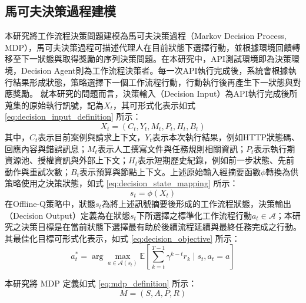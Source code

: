 \begin{ZhChapter}
\subsection{馬可夫決策過程建模}
\text 本研究將工作流程決策問題建模為馬可夫決策過程（Markov Decision Process, MDP），馬可夫決策過程可描述代理人在目前狀態下選擇行動，並根據環境回饋轉移至下一狀態與取得獎勵的序列決策問題\parencite{rao2022foundations}。在本研究中，API測試環境即為決策環境，Decision Agent則為工作流程決策者。每一次API執行完成後，系統會根據執行結果形成狀態，策略選擇下一個工作流程行動，行動執行後再產生下一狀態與對應獎勵。
\text 就本研究的問題而言，決策輸入（Decision Input）為API執行完成後所蒐集的原始執行訊號，記為$X_t$，其可形式化表示如式 \eqref{eq:decision_input_definition} 所示：
\begin{equation}
\label{eq:decision_input_definition}
X_t=(C_t,Y_t,M_t,P_t,H_t,B_t)
\end{equation}
\text 其中，$C_t$表示目前案例與請求上下文，$Y_t$表示本次執行結果，例如HTTP狀態碼、回應內容與錯誤訊息；$M_t$表示人工撰寫文件與任務規則相關資訊；$P_t$表示執行期資源池、授權資訊與外部上下文；$H_t$表示短期歷史紀錄，例如前一步狀態、先前動作與重試次數；$B_t$表示預算與節點上下文。上述原始輸入經摘要函數$\phi$轉換為供策略使用之決策狀態，如式 \eqref{eq:decision_state_mapping} 所示：
\begin{equation}
\label{eq:decision_state_mapping}
s_t=\phi(X_t)
\end{equation}
\text 在Offline-Q策略中，狀態$s_t$為將上述訊號摘要後形成的工作流程狀態，決策輸出（Decision Output）定義為在狀態$s_t$下所選擇之標準化工作流程行動$a_t \in \mathcal{A}$；本研究之決策目標是在當前狀態下選擇最有助於後續流程延續與最終任務完成之行動。其最佳化目標可形式化表示，如式 \eqref{eq:decision_objective} 所示：
\begin{equation}
\label{eq:decision_objective}
a_t^*=\arg\max_{a \in \mathcal{A}(s_t)}
\mathbb{E}\left[
\sum_{k=t}^{T-1}\gamma^{k-t} r_k \mid s_t, a_t=a
\right]
\end{equation}

\text 本研究將 MDP 定義如式 \eqref{eq:mdp_definition} 所示：
\begin{equation}
\label{eq:mdp_definition}
M=(S,A,P,R)
\end{equation}


\end{ZhChapter}
